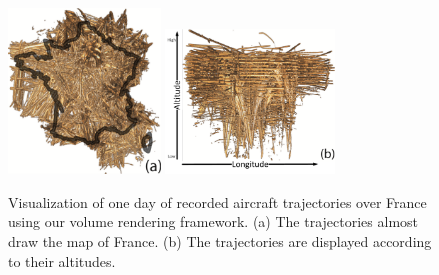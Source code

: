 \begin{figure} 
\includegraphics [width=0.36\textwidth]{images/topViewFR.png} 
\includegraphics [width=0.4\textwidth]{images/VerticalViewLabel.png} 
\caption{Visualization of one day of recorded aircraft trajectories over France using our volume rendering framework. (a) The trajectories almost draw the map of France. (b) The trajectories are displayed according to their altitudes. }
\label{f:aircraft_orientation}
\end{figure}


